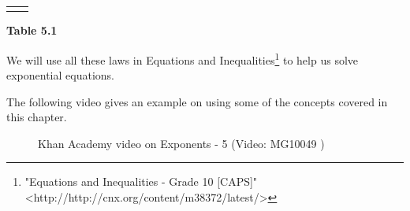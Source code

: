 {\begin{center}
\begin{xtabular*}{\mytablewidth}[t]{|p{10\mystarwidth}|p{10\mystarwidth}|}
                 &
     \tabularnewline{}
    \end{xtabular*}
      \end{center}
    \begin{center}{\small\bfseries Table 5.1}\end{center}
        }%
    \par
      \label{m38359*eip-117}We will use all these laws in Equations and Inequalities\footnote{\raggedright{}"Equations and Inequalities - Grade 10 [CAPS]" <http://http://cnx.org/content/m38372/latest/>} to help us solve exponential equations.\par \label{m38359*eip-160}The following video gives an example on using some of the concepts covered in this chapter.
    \setcounter{subfigure}{0}
	\begin{figure}[H] %
    \textnormal{Khan Academy video on Exponents - 5}\vspace{.1in} \nopagebreak
  \label{m38359*yt-media5}\label{m38359*yt-video5}
             { (Video:  MG10049 )}
      \vspace{2pt}
    \vspace{.1in}
 \end{figure}       \par 
